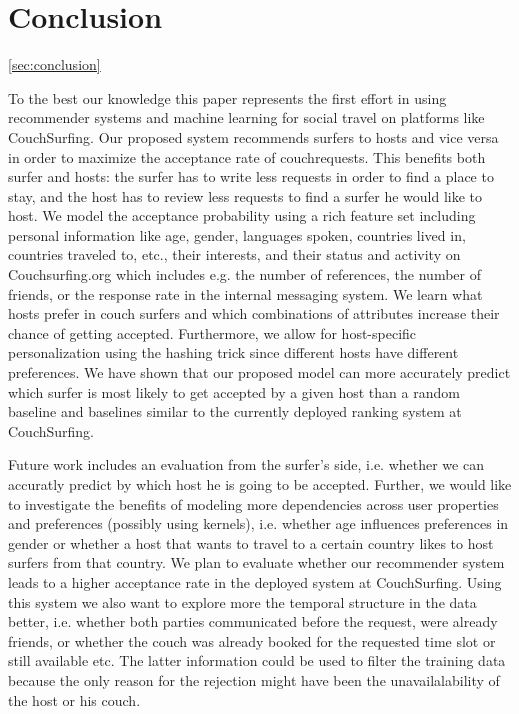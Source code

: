 \section{Conclusion} \autoref{sec:conclusion}

To the best our knowledge this paper represents the first effort in using recommender systems and machine learning for social travel on platforms like CouchSurfing.
Our proposed system recommends surfers to hosts and vice versa in order to maximize the acceptance rate of couchrequests. This benefits both surfer and hosts: the surfer has to write less requests in order to find a place to
stay, and the host has to review less requests to find a surfer he would like to host.
We model the acceptance probability using a rich feature set including personal information like age, gender, languages spoken, countries lived in, countries traveled to, etc., their interests, and their status and activity on Couchsurfing.org which includes e.g. the number of references, the number of friends, or the response rate in the internal messaging system.
We learn what hosts prefer in couch surfers and which combinations of attributes increase their chance of getting accepted. Furthermore, we allow for host-specific personalization using the hashing trick since different hosts have 
different preferences.
We have shown that our proposed model can more accurately predict which surfer is most likely to get accepted by a given host than a random baseline and baselines similar to the currently deployed ranking system at CouchSurfing.

Future work includes an evaluation from the surfer's side, i.e. whether we can accuratly predict by which host he is going to be accepted. Further, we would like to investigate the benefits of modeling more dependencies across user properties and preferences (possibly using kernels), i.e. whether age influences preferences in gender or whether a host that wants to travel to a certain country likes to host surfers from that country. We plan to evaluate whether our recommender system leads to a higher acceptance rate in the deployed system at CouchSurfing. Using this system we also want to explore more the temporal structure in the data better, i.e. whether both parties communicated before the request, were already friends, or whether the couch was already booked for the requested time slot or still available etc. The latter information could be used to filter the training data because the only reason for the rejection might have been the unavailalability of the host or his couch.
